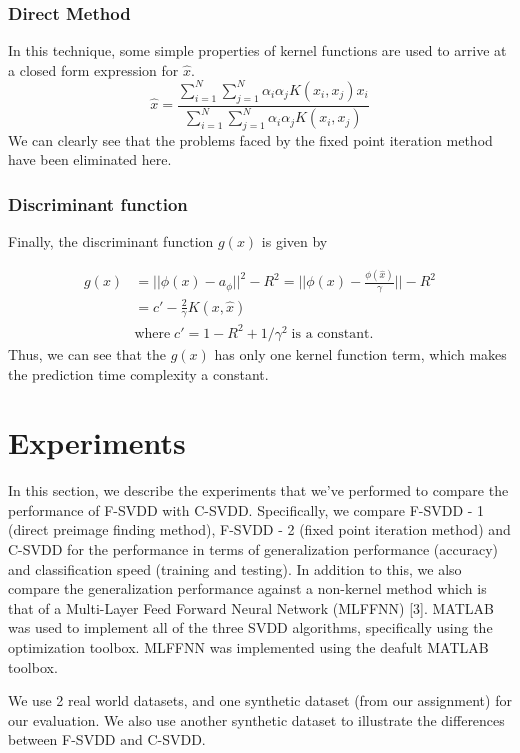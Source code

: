 \documentclass{article} %
\begin{document}
\subsubsection*{Direct Method} 

In this technique, some simple properties of kernel functions are used to arrive at a closed form expression for $\hat{x}$.
\[ \hat{x} = \frac{\sum\limits_{i=1}^N \sum\limits_{j=1}^N \alpha_i \alpha_j K(x_i,x_j) x_i}{\sum\limits_{i=1}^N \sum\limits_{j=1}^N \alpha_i \alpha_j K(x_i,x_j)} \]
We can clearly see that the problems faced by the fixed point iteration method have been eliminated here.	

\subsubsection{Discriminant function}
Finally, the discriminant function $g(x)$ is given by 

\begin{equation}
\begin{split}
g(x) &= || \phi(x) - a_\phi||^2 - R^2 = ||\phi(x) - \frac{\phi(\hat{x})}{\gamma} || - R^2 \\
 &=   c' - \frac{2}{\gamma} K(x,\hat{x}) \\
 & \text{where}\;  c' = 1- R^2 + 1/\gamma^2 \; \text{is a constant}.
\end{split}
\end{equation}
Thus, we can see that the $g(x)$ has only one kernel function term, which makes the prediction time complexity a constant.

\section{Experiments}
In this section, we describe the experiments that we've performed to compare the performance of F-SVDD with C-SVDD. Specifically, we compare F-SVDD - 1 (direct preimage finding method), F-SVDD - 2 (fixed point iteration method) and C-SVDD for the performance in terms of generalization performance (accuracy) and classification speed (training and testing). In addition to this, we also compare the generalization performance against a non-kernel method which is that of a Multi-Layer Feed Forward Neural Network (MLFFNN) [3]. MATLAB was used to implement all of the three SVDD algorithms, specifically using the optimization toolbox. MLFFNN was implemented using the deafult MATLAB toolbox. 


We use 2 real world datasets, and one synthetic dataset (from our assignment) for our evaluation. We also use another synthetic dataset to illustrate the differences between F-SVDD and C-SVDD.
\end{document}
